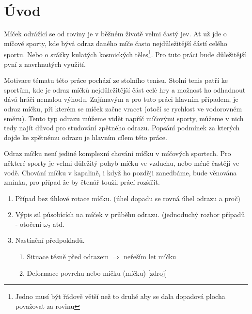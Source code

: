 \chapter*{Úvod}

Míček odrážící se od roviny je v běžném životě velmi častý jev. Ať už jde o
míčové sporty, kde bývá odraz daného míče často nejdůležitější částí celého
sportu. Nebo o srážky kulatých kosmických
těles\footnote{Jedno musí být řádově větší než to druhé aby se dala dopadová plocha
považovat za rovinu}. Pro tuto práci bude důležitější pvní z navrhnutých
využití. 

Motivace tématu této práce pochází ze stolního tenisu. Stolní tenis patří ke
sportům, kde je odraz míčků nejdůležitější část celé hry a možnost ho
odhadnout dává hráči nemalou výhodu. Zajímavým a pro tuto práci hlavním
případem, je odraz míčku, při kterém se míček začne vracet (otočí se rychlost ve
vodorovném směru). Tento typ odrazu můžeme vidět napříč míčovými sporty, můžeme
v nich tedy najít důvod pro studování zpětného odrazu. Popsání podmínek za
kterých dojde ke zpětnému odrazu je hlavním cílem této práce.

Odraz míčku není jediné komplexní chování míčku v míčových sportech. Pro některé
sporty je velmi důležitý pohyb míčku ve vzduchu, nebo méně častěji ve vodě.
Chování míčku v kapalině, i když ho později zanedbáme, bude věnována
zmínka, pro případ že by čtenář toužil prácí rozšířit.


\begin{enumerate}
 \item Případ bez úhlové rotace míčku. (úhel dopadu se rovná úhel odrazu a proč)
 \item Výpis sil působících na míček v průběhu odrazu. (jednoduchý rozbor
  případů - otočení $\omega_2$ atd.
 \item Nastínění předpokladů.
 \begin{enumerate}
  \item Situace těsně před odrazem $ \Rightarrow $ neřeším let míčku
  \item Deformace povrchu nebo míčku (míčku) [zdroj]
 \end{enumerate}
\end{enumerate}
